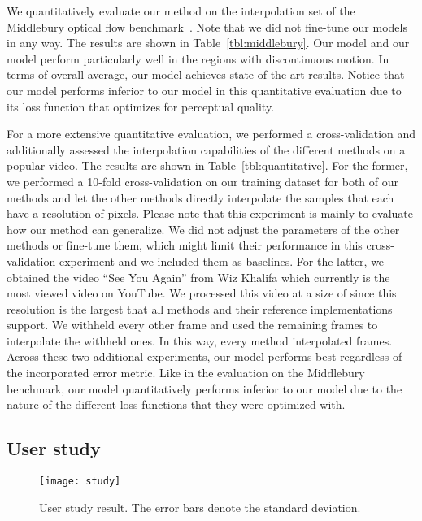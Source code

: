 \documentclass[10pt,twocolumn,letterpaper]{article}
\begin{document}
We quantitatively evaluate our method on the interpolation set of the Middlebury optical flow benchmark~\cite{Baker_OTHER_2011}. Note that we did not fine-tune our models in any way. The results are shown in Table~\ref{tbl:middlebury}. Our  model and our  model perform particularly well in the regions with discontinuous motion. In terms of overall average, our  model achieves state-of-the-art results. Notice that our  model performs inferior to our  model in this quantitative evaluation due to its loss function that optimizes for perceptual quality.

For a more extensive quantitative evaluation, we performed a cross-validation and additionally assessed the interpolation capabilities of the different methods on a popular video. The results are shown in Table~\ref{tbl:quantitative}. For the former, we performed a 10-fold cross-validation on our training dataset for both of our methods and let the other methods directly interpolate the  samples that each have a resolution of  pixels. Please note that this experiment is mainly to evaluate how our method can generalize. We did not adjust the parameters of the other methods or fine-tune them, which might limit their performance in this cross-validation experiment and we included them as baselines. For the latter, we obtained the video ``See You Again'' from Wiz Khalifa which currently is the most viewed video on YouTube. We processed this video at a size of  since this resolution is the largest that all methods and their reference implementations support. We withheld every other frame and used the remaining frames to interpolate the withheld ones. In this way, every method interpolated  frames. Across these two additional experiments, our  model performs best regardless of the incorporated error metric. Like in the evaluation on the Middlebury benchmark, our  model quantitatively performs inferior to our  model due to the nature of the different loss functions that they were optimized with.

\subsection{User study}

\begin{figure*}\centering
    \hspace*{-0.2cm}\texttt{[image: study]}\vspace{-0.3cm}
	\caption{User study result. The error bars denote the standard deviation.}\vspace{-0.5cm}
	\label{fig:study}
\end{figure*}
\end{document}
